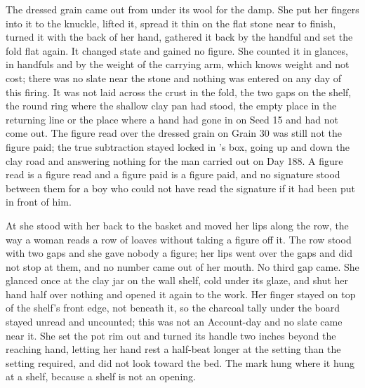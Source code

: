 The dressed grain came out from under its wool for the damp. She put her fingers into it to the knuckle, lifted it, spread it thin on the flat stone near  to finish, turned it with the back of her hand, gathered it back by the handful and set the fold flat again. It changed state and gained no figure. She counted it in glances, in handfuls and by the weight of the carrying arm, which knows weight and not cost; there was no slate near the stone and nothing was entered on any day of this firing. It was not laid across the crust in the fold, the two gaps on the shelf, the round ring where the shallow clay pan had stood, the empty place in the returning line or the place where a hand had gone in on Seed 15 and had not come out. The figure read over the dressed grain on Grain 30 was still not the figure paid; the true subtraction stayed locked in 's box, going up and down the clay road and answering nothing for the man carried out on Day 188. A figure read is a figure read and a figure paid is a figure paid, and no signature stood between them for a boy who could not have read the signature if it had been put in front of him.

\scenebreak

At  she stood with her back to the basket and moved her lips along the row, the way a woman reads a row of loaves without taking a figure off it. The row stood with two gaps and she gave nobody a figure; her lips went over the gaps and did not stop at them, and no number came out of her mouth. No third gap came. She glanced once at the clay jar on the wall shelf, cold under its glaze, and shut her hand half over nothing and opened it again to the work. Her finger stayed on top of the shelf's front edge, not beneath it, so the charcoal tally under the board stayed unread and uncounted; this was not an Account-day and no slate came near it. She set the pot rim out and turned its handle two inches beyond the reaching hand, letting her hand rest a half-beat longer at the setting than the setting required, and did not look toward the bed. The mark hung where it hung at a shelf, because a shelf is not an opening.

